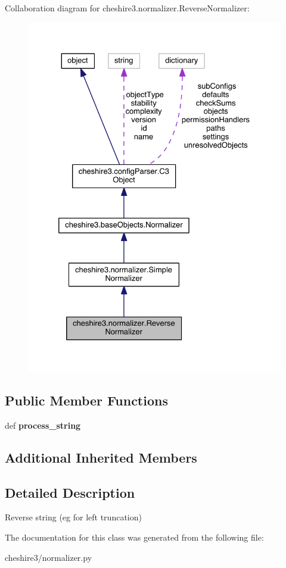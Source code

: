 Collaboration diagram for cheshire3.\-normalizer.\-Reverse\-Normalizer\-:
\nopagebreak
\begin{figure}[H]
\begin{center}
\leavevmode
\includegraphics[width=328pt]{classcheshire3_1_1normalizer_1_1_reverse_normalizer__coll__graph}
\end{center}
\end{figure}
\subsection*{Public Member Functions}
\begin{DoxyCompactItemize}
\item 
\hypertarget{classcheshire3_1_1normalizer_1_1_reverse_normalizer_aa003579aac0ef09f217ec3cd13fad686}{def {\bfseries process\-\_\-string}}\label{classcheshire3_1_1normalizer_1_1_reverse_normalizer_aa003579aac0ef09f217ec3cd13fad686}

\end{DoxyCompactItemize}
\subsection*{Additional Inherited Members}


\subsection{Detailed Description}
\begin{DoxyVerb}Reverse string (eg for left truncation) \end{DoxyVerb}
 

The documentation for this class was generated from the following file\-:\begin{DoxyCompactItemize}
\item 
cheshire3/normalizer.\-py\end{DoxyCompactItemize}
